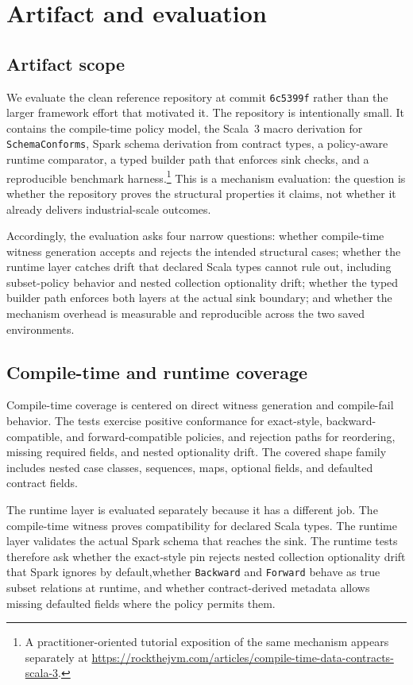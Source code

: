 \section{Artifact and evaluation}

\subsection{Artifact scope}

We evaluate the clean reference repository at commit \texttt{6c5399f} rather than the larger framework effort that motivated it. The repository is intentionally small. It contains the compile-time policy model, the Scala~3 macro derivation for \texttt{SchemaConforms}, Spark schema derivation from contract types, a policy-aware runtime comparator, a typed builder path that enforces sink checks, and a reproducible benchmark harness.\footnote{A practitioner-oriented tutorial exposition of the same mechanism appears separately at \url{https://rockthejvm.com/articles/compile-time-data-contracts-scala-3}.} This is a mechanism evaluation: the question is whether the repository proves the structural properties it claims, not whether it already delivers industrial-scale outcomes.

Accordingly, the evaluation asks four narrow questions: whether compile-time witness generation accepts and rejects the intended structural cases; whether the runtime layer catches drift that declared Scala types cannot rule out, including subset-policy behavior and nested collection optionality drift; whether the typed builder path enforces both layers at the actual sink boundary; and whether the mechanism overhead is measurable and reproducible across the two saved environments.

\subsection{Compile-time and runtime coverage}

Compile-time coverage is centered on direct witness generation and compile-fail behavior. The tests exercise positive conformance for exact-style, backward-compatible, and forward-compatible policies, and rejection paths for reordering, missing required fields, and nested optionality drift. The covered shape family includes nested case classes, sequences, maps, optional fields, and defaulted contract fields.

The runtime layer is evaluated separately because it has a different job. The compile-time witness proves compatibility for declared Scala types. The runtime layer validates the actual Spark schema that reaches the sink. The runtime tests therefore ask whether the exact-style pin rejects nested collection optionality drift that Spark ignores by default,\carriermoved whether \texttt{Backward} and \texttt{Forward} behave as true subset relations at runtime, and whether contract-derived metadata allows missing defaulted fields where the policy permits them.

